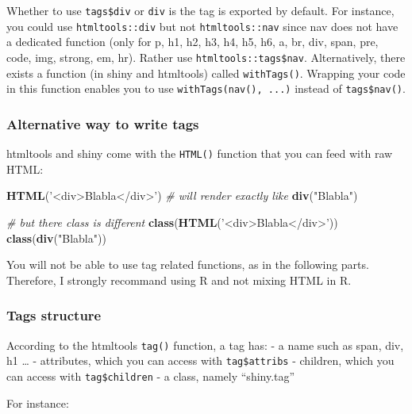 \documentclass[]{book}
\newenvironment{Shaded}{\begin{snugshade}}{\end{snugshade}}
\newcommand{\CommentTok}[1]{\textcolor[rgb]{0.56,0.35,0.01}{\textit{#1}}}
\newcommand{\KeywordTok}[1]{\textcolor[rgb]{0.13,0.29,0.53}{\textbf{#1}}}
\newcommand{\NormalTok}[1]{#1}
\newcommand{\StringTok}[1]{\textcolor[rgb]{0.31,0.60,0.02}{#1}}
\begin{document}
Whether to use \texttt{tags\$div} or \texttt{div} is the tag is exported by default.
For instance, you could use \texttt{htmltools::div} but not \texttt{htmltools::nav} since nav does not
have a dedicated function (only for p, h1, h2, h3, h4, h5, h6, a, br, div, span, pre, code, img, strong, em, hr).
Rather use \texttt{htmltools::tags\$nav}. Alternatively, there exists a function (in shiny and htmltools)
called \texttt{withTags()}. Wrapping your code in this function enables you to use \texttt{withTags(nav(),\ ...)}
instead of \texttt{tags\$nav()}.

\hypertarget{alternative-way-to-write-tags}{%
\subsubsection{Alternative way to write tags}\label{alternative-way-to-write-tags}}

htmltools and shiny come with the \texttt{HTML()} function that you can feed with raw HTML:

\begin{Shaded}
\begin{Highlighting}[]
\KeywordTok{HTML}\NormalTok{(}\StringTok{'<div>Blabla</div>'}\NormalTok{)}
\CommentTok{# will render exactly like}
\KeywordTok{div}\NormalTok{(}\StringTok{"Blabla"}\NormalTok{)}

\CommentTok{# but there class is different}
\KeywordTok{class}\NormalTok{(}\KeywordTok{HTML}\NormalTok{(}\StringTok{'<div>Blabla</div>'}\NormalTok{))}
\KeywordTok{class}\NormalTok{(}\KeywordTok{div}\NormalTok{(}\StringTok{"Blabla"}\NormalTok{))}
\end{Highlighting}
\end{Shaded}

You will not be able to use tag related functions, as in the following parts.
Therefore, I strongly recommand using R and not mixing HTML in R.

\hypertarget{tags-structure}{%
\subsubsection{Tags structure}\label{tags-structure}}

According to the htmltools \texttt{tag()} function, a tag has:
- a name such as span, div, h1 \ldots{}
- attributes, which you can access with \texttt{tag\$attribs}
- children, which you can access with \texttt{tag\$children}
- a class, namely ``shiny.tag''

For instance:
\end{document}
